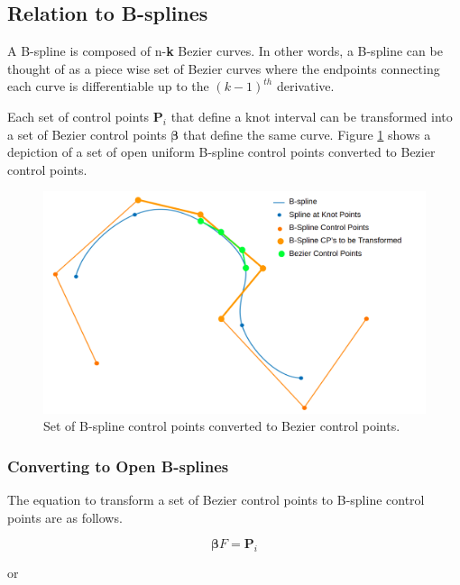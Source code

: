 \documentclass{article}
\begin{document}
\subsection{Relation to B-splines}

A B-spline is composed of n-\textbf{k} Bezier curves. In other words, a B-spline can be thought of as a piece wise set of Bezier curves where the endpoints connecting each curve is differentiable up to the \((k-1)^{th}\) derivative. 

Each set of control points \(\textbf{P}_i\) that define a knot interval can be transformed into a set of Bezier control points \(\boldsymbol{\beta}\) that define the same curve. Figure \ref{Fig:BsplineToBezier} shows a depiction of a set of open uniform B-spline control points converted to Bezier control points.

\begin{figure}[H]
\begin{center}
\includegraphics[scale=.3]{BsplineToBezier.png}
\end{center}
\caption{Set of B-spline control points converted to Bezier control points.}
\label{Fig:BsplineToBezier}
\end{figure}

\subsubsection{Converting to Open B-splines}

The equation to transform a set of Bezier control points to B-spline control points are as follows.

\begin{equation}
    \boldsymbol{\beta} F = \textbf{P}_i
\end{equation}

or
\end{document}

